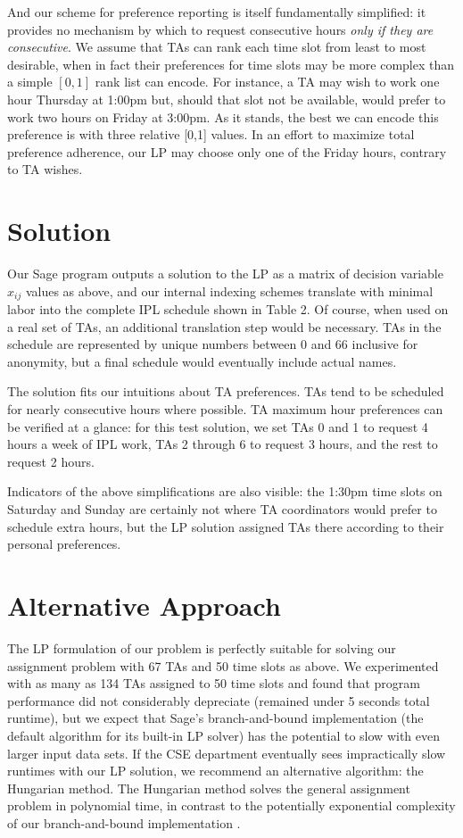 \documentclass{article}
\begin{document}
\begin{multicols}{2}
And our scheme for preference reporting is itself fundamentally simplified: it provides no mechanism by which to request consecutive hours \textit{only if they are consecutive}. We assume that TAs can rank each time slot from least to most desirable, when in fact their preferences for time slots may be more complex than a simple $[0, 1]$ rank list can encode. For instance, a TA may wish to work one hour Thursday at 1:00pm but, should that slot not be available, would prefer to work two hours on Friday at 3:00pm. As it stands, the best we can encode this preference is with three relative [0,1] values. In an effort to maximize total preference adherence, our LP may choose only one of the Friday hours, contrary to TA wishes.

\section*{Solution}

Our Sage program outputs a solution to the LP as a matrix of decision variable $x_{ij}$ values as above, and our internal indexing schemes translate with minimal labor into the complete IPL schedule shown in Table 2. Of course, when used on a real set of TAs, an additional translation step would be necessary. TAs in the schedule are represented by unique numbers between 0 and 66 inclusive for anonymity, but a final schedule would eventually include actual names.

The solution fits our intuitions about TA preferences. TAs tend to be scheduled for nearly consecutive hours where possible. TA maximum hour preferences can be verified at a glance: for this test solution, we set TAs 0 and 1 to request 4 hours a week of IPL work, TAs 2 through 6 to request 3 hours, and the rest to request 2 hours.

Indicators of the above simplifications are also visible: the 1:30pm time slots on Saturday and Sunday are certainly not where TA coordinators would prefer to schedule extra hours, but the LP solution assigned TAs there according to their personal preferences.

\section*{Alternative Approach}

The LP formulation of our problem is perfectly suitable for solving our assignment problem with 67 TAs and 50 time slots as above. We experimented with as many as 134 TAs assigned to 50 time slots and found that program performance did not considerably depreciate (remained under 5 seconds total runtime), but we expect that Sage's branch-and-bound implementation (the default algorithm for its built-in LP solver) has the potential to slow with even larger input data sets. If the CSE department eventually sees impractically slow runtimes with our LP solution, we recommend an alternative algorithm: the Hungarian method. The Hungarian method solves the general assignment problem in polynomial time, in contrast to the potentially exponential complexity of our branch-and-bound implementation \cite{wiki}.


\end{multicols}
\end{document}
